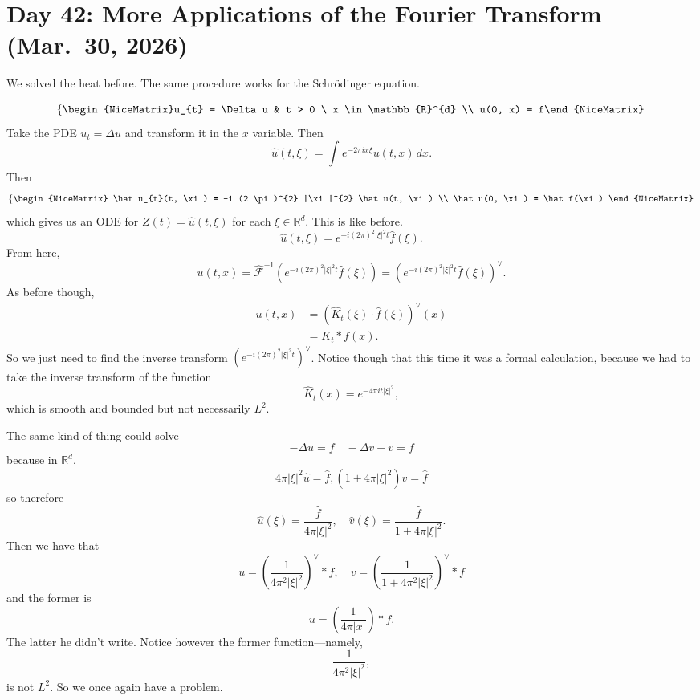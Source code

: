 \section{Day 42: More Applications of the Fourier Transform (Mar.\ 30, 2026)}
We solved the heat before. The same procedure works for the Schr\"odinger equation.
\begin{example}
	\[ \left\{\begin{NiceMatrix}u_{t} = \Delta u & t > 0 \ x \in \mathbb{R}^{d} \\ u(0, x) = f\end{NiceMatrix}\right.  \]
	Take the PDE \( u_{t} = \Delta u \) and transform it in the \( x \) variable. Then
	\[ \hat u(t, \xi) = \int_{} e^{-2 \pi i x \xi} u(t, x) \, dx. \]
	Then
	\[
		\left\{\begin{NiceMatrix}
				\hat u_{t}(t, \xi) = -i (2 \pi)^{2} |\xi|^{2} \hat u(t, \xi) \\
				\hat u(0, \xi) = \hat f(\xi)
		\end{NiceMatrix}\right. 
	\]
	which gives us an ODE for \( Z(t) = \hat u(t, \xi) \) for each \( \xi \in \mathbb{R}^{d} \). This is like before.
	\[ \hat u(t, \xi) = e^{-i (2 \pi)^{2} |\xi|^{2} t} \hat f(\xi). \]
	From here, 
	\[ u(t, x) = \hat {\mathcal{F}}^{-1}\left( e^{-i (2 \pi)^{2} |\xi|^{2} t}\hat f(\xi) \right) = \left( e^{-i \left( 2 \pi \right)^{2} |\xi|^{2} t} \hat f(\xi) \right)^{\vee}. \]
	As before though,
	\begin{align*}
		u(t, x) &= \left( \hat K_{t}(\xi) \cdot \hat f(\xi) \right)^{\vee}(x) \\
						&= K_{t} * f(x).
	\end{align*}
	So we just need to find the inverse transform \( \left( e^{-i (2 \pi)^{2}|\xi|^{2} t} \right)^{\vee} \). Notice though that this time it was a formal calculation, because we had to take the inverse transform of the function
	\[ \hat K_{t}(x) = e^{-4 \pi i t |\xi|^{2}}, \]
	which is smooth and bounded but not necessarily \( L^{2} \).
\end{example}

\begin{example}
	The same kind of thing could solve
	\[ - \Delta u = f \quad - \Delta v + v = f  \]
	because in \( \mathbb{R}^{d} \),
	\[ 4 \pi |\xi|^{2} \hat u = \hat f, (1 + 4 \pi |\xi|^{2})\hat v = \hat f \]
	so therefore
	\[ \hat u(\xi) = \frac{\hat f}{4 \pi |\xi|^{2}}, \quad \hat v (\xi) = \frac{\hat f}{1 + 4 \pi |\xi|^{2}}. \]
	Then we have that
	\[ u = \left( \frac{1}{4 \pi^{2} |\xi|^{2}} \right)^{\vee} * f, \quad v = \left( \frac{1}{1 + 4 \pi^{2} |\xi|^{2}} \right)^{\vee} * f \]
	and the former is
	\[ u = \left( \frac{1}{4 \pi |x|} \right) * f. \]
	The latter he didn't write. Notice however the former function---namely,
	\[ \frac{1}{4 \pi^{2} |\xi|^{2}}, \]
	is not \( L^{2} \). So we once again have a problem.
\end{example}

